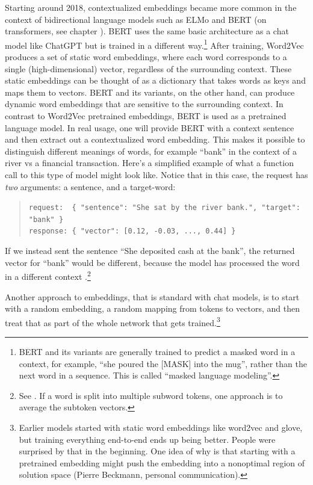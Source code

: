 Starting around 2018, contextualized embeddings became more common in the context of bidirectional language models such as ELMo and  BERT \cite{devlin2018bert} (on transformers, see chapter ). BERT uses the same basic architecture as a chat model like ChatGPT but is trained in a different way.\footnote{BERT and its variants are generally trained to predict a masked word in a context, for example, ``she poured the [MASK] into the mug'', rather than the next word in a sequence. This is called ``masked language modeling''.} After training, Word2Vec produces a set of static word embeddings, where each word corresponds to a single (high-dimensional) vector, regardless of the surrounding context. These static embeddings can be thought of as a dictionary that takes words as keys and maps them to vectors. BERT and its variants, on the other hand, can produce dynamic word embeddings that are sensitive to the surrounding context. In contrast to Word2Vec pretrained embeddings, BERT is used as a pretrained language model. In real usage, one will provide BERT with a context sentence and then extract out a contextualized word embedding. This makes it possible to distinguish different meanings of words, for example ``bank'' in the context of a river vs a financial transaction. Here's a simplified example of what a function call to this type of model might look like. Notice that in this case, the request has \emph{two} arguments: a sentence, and a target-word:

\begin{quote}
\verb|request:  { "sentence": "She sat by the river bank.", "target": "bank" }|\\
\verb|response: { "vector": [0.12, -0.03, ..., 0.44] }|
\end{quote}

If we instead sent the sentence ``She deposited cash at the bank'', the returned vector for ``bank'' would be different, because the model has processed the word in a different context \cite{ethayarajh2019contextual}.\footnote{See . If a word is split into multiple subword tokens, one approach is to average the subtoken vectors.} 

Another approach to embeddings, that is standard with chat models, is to start with a random embedding, a random mapping from tokens to vectors, and then treat that as part of the whole network that gets trained.\footnote{Earlier models started with static word embeddings like word2vec and glove, but training everything end-to-end ends up being better. People were surprised by that in the beginning. One idea of why is that starting with a pretrained embedding might push the embedding into a nonoptimal region of solution space (Pierre Beckmann, personal communication).}


